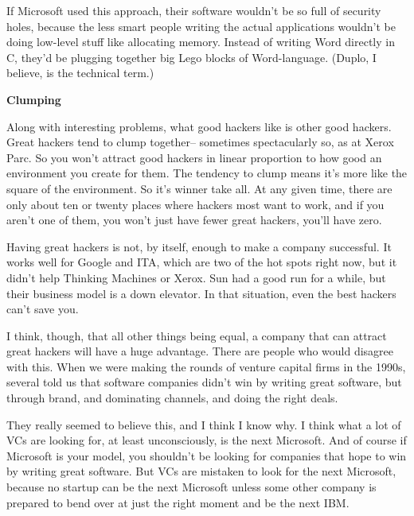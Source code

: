 If Microsoft used this approach, their
                    software wouldn't be so full of security holes, because the
                    less smart people writing the actual applications wouldn't
                    be doing low-level stuff like allocating memory. Instead of
                    writing Word directly in C, they'd be plugging together big
                    Lego blocks of Word-language. (Duplo, I believe, is the
                    technical term.)

\textbf{Clumping}

Along
                    with interesting problems, what good hackers like is other
                    good hackers. Great hackers tend to clump together--
                    sometimes spectacularly so, as at Xerox Parc. So you won't
                    attract good hackers in linear proportion to how good an
                    environment you create for them. The tendency to clump means
                    it's more like the square of the environment. So it's winner
                    take all. At any given time, there are only about ten or
                    twenty places where hackers most want to work, and if you
                    aren't one of them, you won't just have fewer great hackers,
                    you'll have zero.

Having great hackers is not, by
                    itself, enough to make a company successful. It works well
                    for Google and ITA, which are two of the hot spots right
                    now, but it didn't help Thinking Machines or Xerox. Sun had
                    a good run for a while, but their business model is a down
                    elevator. In that situation, even the best hackers can't
                    save you.

I think, though, that all other things
                    being equal, a company that can attract great hackers will
                    have a huge advantage. There are people who would disagree
                    with this. When we were making the rounds of venture capital
                    firms in the 1990s, several told us that software companies
                    didn't win by writing great software, but through brand, and
                    dominating channels, and doing the right deals.

They
                    really seemed to believe this, and I think I know why. I
                    think what a lot of VCs are looking for, at least
                    unconsciously, is the next Microsoft. And of course if
                    Microsoft is your model, you shouldn't be looking for
                    companies that hope to win by writing great software. But
                    VCs are mistaken to look for the next Microsoft, because no
                    startup can be the next Microsoft unless some other company
                    is prepared to bend over at just the right moment and be the
                    next IBM.

